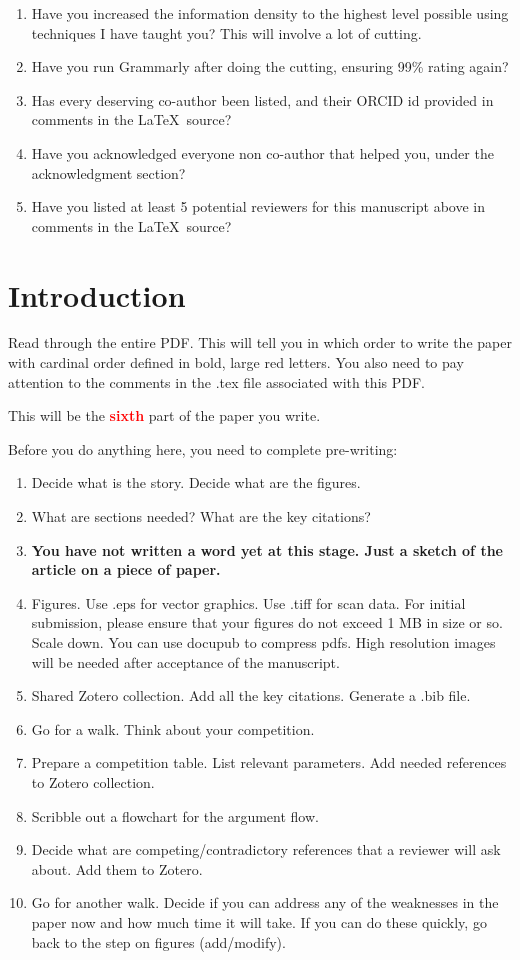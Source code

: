 \documentclass[12 pt]{article}
\begin{document}
{{\begin{enumerate}
\item Have you increased the information density to the highest level possible using techniques I have taught you? This will involve a lot of cutting.
\item Have you run Grammarly after doing the cutting, ensuring 99\% rating again?
\item Has every deserving co-author been listed, and their ORCID id provided in comments in the \LaTeX\ source?
\item Have you acknowledged everyone non co-author that helped you, under the acknowledgment section?
\item Have you listed at least 5 potential reviewers for this manuscript above in comments in the \LaTeX\ source?
\end{enumerate}
}
}

  
\section{Introduction}
\label{sec:introduction}

Read through the entire PDF. This will tell you in which order to write the paper with cardinal order defined in bold, large red letters. You also need to pay attention to the comments in the .tex file associated with this PDF.

This will be the \textbf{\Huge \textcolor{red}{sixth}} part of the paper you write.

Before you do anything here, you need to complete pre-writing:

\begin{enumerate}
\item Decide what is the story. Decide what are the figures.
\item What are sections needed? What are the key citations?
\item \textbf{You have not written a word yet at this stage. Just a sketch of the article on a piece of paper.}
\item Figures. Use .eps for vector graphics. Use .tiff for scan data. For initial submission, please ensure that your figures do not exceed 1 MB in size or so. Scale down. You can use docupub to compress pdfs. High resolution images will be needed after acceptance of the manuscript.
\item Shared Zotero collection. Add all the key citations. Generate a .bib file.
\item Go for a walk. Think about your competition.
\item Prepare a competition table. List relevant parameters. Add needed references to Zotero collection.
\item Scribble out a flowchart for the argument flow.
\item Decide what are competing/contradictory references that a reviewer will ask about. Add them to Zotero.
\item Go for another walk. Decide if you can address any of the weaknesses in the paper now and how much time it will take. If you can do these quickly, go back to the step on figures (add/modify).
\end{enumerate}
\end{document}
